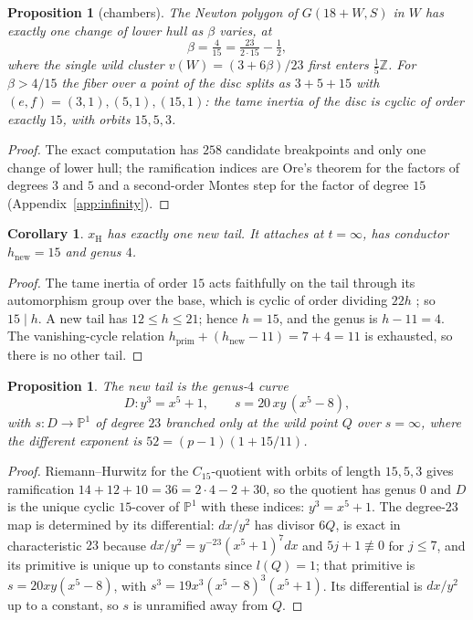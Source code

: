 \documentclass[11pt]{amsart}
\newcommand{\ZZ}{\mathbb{Z}}
\newcommand{\PP}{\mathbb{P}}
\newcommand{\xH}{x_{\mathrm H}}
\theoremstyle{plain}
\newtheorem{proposition}[theorem]{Proposition}
\newtheorem{corollary}[theorem]{Corollary}
\theoremstyle{definition}
\begin{document}
\begin{proposition}[chambers]\label{prop:chambers}
The Newton polygon of $G(18+W,S)$ in $W$ has exactly one change of
lower hull as $\beta$ varies, at
\[
  \beta=\tfrac4{15}=\tfrac{23}{2\cdot15}-\tfrac12 ,
\]
where the single wild cluster $v(W)=(3+6\beta)/23$ first enters
$\tfrac15\ZZ$. For $\beta>4/15$ the fiber over a point of the disc
splits as $3+5+15$ with $(e,f)=(3,1),(5,1),(15,1)$: the tame inertia
of the disc is cyclic of order exactly $15$, with orbits $15,5,3$.
\end{proposition}
\begin{proof}
The exact computation has $258$ candidate breakpoints and only one
change of lower hull; the ramification indices are Ore's theorem for
the factors of degrees $3$ and $5$ and a second-order Montes step for
the factor of degree $15$ (Appendix~\ref{app:infinity}).
\end{proof}

\begin{corollary}\label{cor:hnew}
$\xH$ has exactly one new tail. It attaches at $t=\infty$, has
conductor $h_{\mathrm{new}}=15$ and genus $4$.
\end{corollary}
\begin{proof}
The tame inertia of order $15$ acts faithfully on the tail through
its automorphism group over the base, which is cyclic of order dividing
$22h$ \cite[Prop.~3.11]{Wewers}; so $15\mid h$. A new tail has
$12\le h\le21$; hence $h=15$, and the genus is $h-11=4$. The
vanishing-cycle relation $h_{\mathrm{prim}}+(h_{\mathrm{new}}-11)=7+4=11$
is exhausted, so there is no other tail.
\end{proof}

\begin{proposition}\label{prop:new}
The new tail is the genus-$4$ curve
\[
  D\colon y^3=x^5+1,\qquad s=20\,xy\,(x^5-8),
\]
with $s\colon D\to\PP^1$ of degree $23$ branched only at the wild
point $Q$ over $s=\infty$, where the different exponent is
$52=(p-1)(1+15/11)$.
\end{proposition}
\begin{proof}
Riemann--Hurwitz for the $C_{15}$-quotient with orbits of length
$15,5,3$ gives ramification $14+12+10=36=2\cdot4-2+30$, so the
quotient has genus $0$ and $D$ is the unique cyclic $15$-cover of
$\PP^1$ with these indices: $y^3=x^5+1$. The degree-$23$ map is
determined by its differential: $dx/y^2$ has divisor $6Q$, is exact in
characteristic $23$ because $dx/y^2=y^{-23}(x^5+1)^7dx$ and
$5j+1\not\equiv0$ for $j\le7$, and its primitive is unique up to
constants since $l(Q)=1$; that primitive is $s=20xy(x^5-8)$, with
$s^3=19x^3(x^5-8)^3(x^5+1)$. Its differential is $dx/y^2$ up to a
constant, so $s$ is unramified away from $Q$.
\end{proof}
\end{document}
